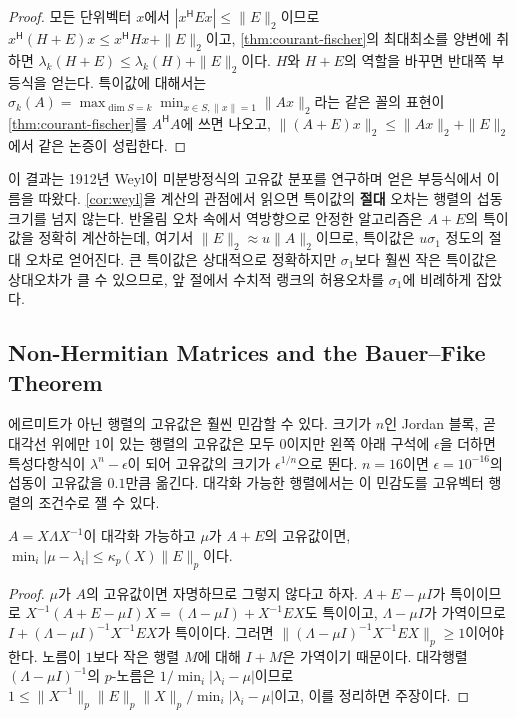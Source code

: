 \begin{proof}
모든 단위벡터 $x$에서 $|x^{\mathsf H}Ex|\le\|E\|_2$이므로 $x^{\mathsf H}(H+E)x\le x^{\mathsf H}Hx+\|E\|_2$이고, \cref{thm:courant-fischer}의 최대최소를 양변에 취하면 $\lambda_k(H+E)\le\lambda_k(H)+\|E\|_2$이다. $H$와 $H+E$의 역할을 바꾸면 반대쪽 부등식을 얻는다. 특이값에 대해서는 $\sigma_k(A)=\max_{\dim S=k}\min_{x\in S,\|x\|=1}\|Ax\|_2$라는 같은 꼴의 표현이 \cref{thm:courant-fischer}를 $A^{\mathsf H}A$에 쓰면 나오고, $\|(A+E)x\|_2\le\|Ax\|_2+\|E\|_2$에서 같은 논증이 성립한다.
\end{proof}

이 결과는 1912년 Weyl이 미분방정식의 고유값 분포를 연구하며 얻은 부등식에서 이름을 따왔다\cite{weyl1912}. \cref{cor:weyl}을 계산의 관점에서 읽으면 특이값의 \textbf{절대} 오차는 행렬의 섭동 크기를 넘지 않는다. 반올림 오차 속에서 역방향으로 안정한 알고리즘은 $A+E$의 특이값을 정확히 계산하는데, 여기서 $\|E\|_2\approx u\|A\|_2$이므로, 특이값은 $u\sigma_1$ 정도의 절대 오차로 얻어진다. 큰 특이값은 상대적으로 정확하지만 $\sigma_1$보다 훨씬 작은 특이값은 상대오차가 클 수 있으므로, 앞 절에서 수치적 랭크의 허용오차를 $\sigma_1$에 비례하게 잡았다.

\subsection{Non-Hermitian Matrices and the Bauer--Fike Theorem}

에르미트가 아닌 행렬의 고유값은 훨씬 민감할 수 있다. 크기가 $n$인 Jordan 블록, 곧 대각선 위에만 $1$이 있는 행렬의 고유값은 모두 $0$이지만 왼쪽 아래 구석에 $\epsilon$을 더하면 특성다항식이 $\lambda^n-\epsilon$이 되어 고유값의 크기가 $\epsilon^{1/n}$으로 뛴다. $n=16$이면 $\epsilon=10^{-16}$의 섭동이 고유값을 $0.1$만큼 옮긴다. 대각화 가능한 행렬에서는 이 민감도를 고유벡터 행렬의 조건수로 잴 수 있다.

\begin{theorem}
\label{thm:bauer-fike}
$A=X\Lambda X^{-1}$이 대각화 가능하고 $\mu$가 $A+E$의 고유값이면, $\min_i|\mu-\lambda_i|\le\kappa_p(X)\|E\|_p$이다.
\end{theorem}

\begin{proof}
$\mu$가 $A$의 고유값이면 자명하므로 그렇지 않다고 하자. $A+E-\mu I$가 특이이므로 $X^{-1}(A+E-\mu I)X=(\Lambda-\mu I)+X^{-1}EX$도 특이이고, $\Lambda-\mu I$가 가역이므로 $I+(\Lambda-\mu I)^{-1}X^{-1}EX$가 특이이다. 그러면 $\|(\Lambda-\mu I)^{-1}X^{-1}EX\|_p\ge1$이어야 한다. 노름이 $1$보다 작은 행렬 $M$에 대해 $I+M$은 가역이기 때문이다. 대각행렬 $(\Lambda-\mu I)^{-1}$의 $p$-노름은 $1/\min_i|\lambda_i-\mu|$이므로 $1\le\|X^{-1}\|_p\|E\|_p\|X\|_p/\min_i|\lambda_i-\mu|$이고, 이를 정리하면 주장이다.
\end{proof}


